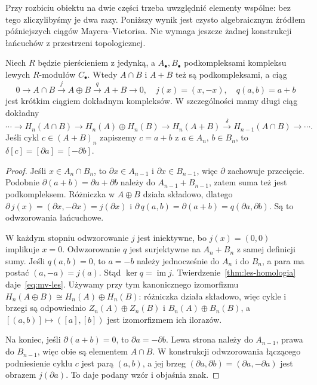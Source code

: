 Przy rozbiciu obiektu na dwie części trzeba
uwzględnić elementy wspólne: bez tego
zliczylibyśmy je dwa razy. Poniższy wynik
jest czysto algebraicznym źródłem
późniejszych ciągów Mayera--Vietorisa.
Nie wymaga jeszcze żadnej konstrukcji
łańcuchów z przestrzeni topologicznej.

\begin{twierdzenie}
\label{thm:mv-algebraiczny}
Niech $R$ będzie pierścieniem z jedynką,
a $A_\bullet,B_\bullet$ podkompleksami
kompleksu lewych $R$-modułów $C_\bullet$. Wtedy
$A\cap B$ i $A+B$ też są podkompleksami,
a ciąg
\begin{equation}\label{eq:mv-ses}
 0\longrightarrow A\cap B
 \xrightarrow{\ j\ }A\oplus B
 \xrightarrow{\ q\ }A+B
 \longrightarrow0,
 \quad j(x)=(x,-x),\quad q(a,b)=a+b
\end{equation}
jest krótkim ciągiem dokładnym kompleksów.
W szczególności mamy długi ciąg dokładny
\begin{equation}\label{eq:mv-les}
 \cdots\to H_n(A\cap B)\to H_n(A)\oplus H_n(B)
 \to H_n(A+B)\xrightarrow{\delta}
 H_{n-1}(A\cap B)\to\cdots.
\end{equation}
Jeśli cykl $c\in(A+B)_n$ zapiszemy
$c=a+b$ z $a\in A_n$, $b\in B_n$,
to $\delta[c]=[\partial a]=[-\partial b]$.
\end{twierdzenie}
\begin{proof}
Jeśli $x\in A_n\cap B_n$, to
$\partial x\in A_{n-1}$ i $\partial x\in B_{n-1}$,
więc $\partial$ zachowuje przecięcie.
Podobnie $\partial(a+b)=\partial a+\partial b$ należy do
$A_{n-1}+B_{n-1}$, zatem suma
też jest podkompleksem.
Różniczka w $A\oplus B$ działa
składowo, dlatego
$\partial\,j(x)=(\partial x,-\partial x)=j(\partial x)$ i
$\partial\,q(a,b)=\partial(a+b)=q(\partial a,\partial b)$.
Są to odwzorowania łańcuchowe.

W każdym stopniu odwzorowanie $j$ jest
iniektywne, bo $j(x)=(0,0)$
implikuje $x=0$. Odwzorowanie $q$ jest
surjektywne na $A_n+B_n$ z samej
definicji sumy. Jeśli $q(a,b)=0$,
to $a=-b$ należy jednocześnie do
$A_n$ i do $B_n$, a para ma postać
$(a,-a)=j(a)$. Stąd
$\ker q=\operatorname{im}j$.
Twierdzenie~\ref{thm:les-homologia}
daje~\eqref{eq:mv-les}. Używamy przy tym kanonicznego izomorfizmu
$H_n(A\oplus B)\cong H_n(A)\oplus H_n(B)$:
różniczka działa składowo, więc cykle i brzegi są odpowiednio
$Z_n(A)\oplus Z_n(B)$ i $B_n(A)\oplus B_n(B)$,
a $[(a,b)]\mapsto([a],[b])$ jest izomorfizmem ich ilorazów.

Na koniec, jeśli $\partial(a+b)=0$, to
$\partial a=-\partial b$. Lewa strona należy do
$A_{n-1}$, prawa do $B_{n-1}$,
więc obie są elementem $A\cap B$.
W konstrukcji odwzorowania łączącego
podniesienie cyklu $c$ jest parą $(a,b)$,
a jej brzeg $(\partial a,\partial b)=(\partial a,-\partial a)$
jest obrazem $j(\partial a)$. To daje
podany wzór i objaśnia znak.
\end{proof}

